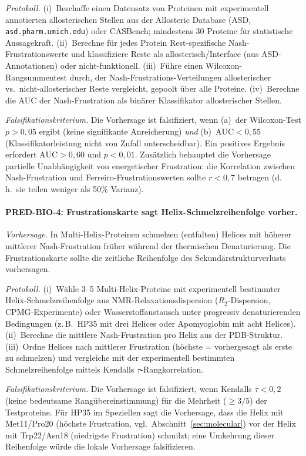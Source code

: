 \documentclass[12pt,a4paper]{article}
\theoremstyle{remark}
\begin{document}
\textit{Protokoll.}
(i)~Beschaffe einen Datensatz von Proteinen mit experimentell annotierten allosterischen Stellen aus der Allosteric Database (ASD, \texttt{asd.pharm.umich.edu}) oder CASBench; mindestens 30 Proteine f\"ur statistische Aussagekraft.
(ii)~Berechne f\"ur jedes Protein Rest-spezifische Nash-Frustrationswerte und klassifiziere Reste als allosterisch/Interface (aus ASD-Annotationen) oder nicht-funktionell.
(iii)~F\"uhre einen Wilcoxon-Rangsummentest durch, der Nash-Frustrations-Verteilungen allosterischer vs.\ nicht-allosterischer Reste vergleicht, gepoolt \"uber alle Proteine.
(iv)~Berechne die AUC der Nash-Frustration als bin\"arer Klassifikator allosterischer Stellen.

\textit{Falsifikationskriterium.}
Die Vorhersage ist falsifiziert, wenn (a)~der Wilcoxon-Test $p > 0{,}05$ ergibt (keine signifikante Anreicherung) \emph{und} (b)~$\text{AUC} < 0{,}55$ (Klassifikatorleistung nicht von Zufall unterscheidbar). Ein positives Ergebnis erfordert $\text{AUC} > 0{,}60$ und $p < 0{,}01$. Zus\"atzlich behauptet die Vorhersage partielle Unabh\"angigkeit von energetischer Frustration: die Korrelation zwischen Nash-Frustration und Ferreiro-Frustrationswerten sollte $r < 0{,}7$ betragen (d.\,h.\ sie teilen weniger als 50\% Varianz).

\paragraph{PRED-BIO-4: Frustrationskarte sagt Helix-Schmelzreihenfolge vorher.}

\textit{Vorhersage.}
In Multi-Helix-Proteinen schmelzen (entfalten) Helices mit h\"oherer mittlerer Nash-Frustration fr\"uher w\"ahrend der thermischen Denaturierung. Die Frustrationskarte sollte die zeitliche Reihenfolge des Sekund\"arstrukturverlusts vorhersagen.

\textit{Protokoll.}
(i)~W\"ahle 3--5 Multi-Helix-Proteine mit experimentell bestimmter Helix-Schmelzreihenfolge aus NMR-Relaxationsdispersion ($R_2$-Dispersion, CPMG-Experimente) oder Wasserstoffaustausch unter progressiv denaturierenden Bedingungen (z.\,B.\ HP35 mit drei Helices oder Apomyoglobin mit acht Helices).
(ii)~Berechne die mittlere Nash-Frustration pro Helix aus der PDB-Struktur.
(iii)~Ordne Helices nach mittlerer Frustration (h\"ochste = vorhergesagt als erste zu schmelzen) und vergleiche mit der experimentell bestimmten Schmelzreihenfolge mittels Kendalls $\tau$-Rangkorrelation.

\textit{Falsifikationskriterium.}
Die Vorhersage ist falsifiziert, wenn Kendalls $\tau < 0{,}2$ (keine bedeutsame Rang\"ubereinstimmung) f\"ur die Mehrheit ($\geq 3/5$) der Testproteine. F\"ur HP35 im Speziellen sagt die Vorhersage, dass die Helix mit Met11/Pro20 (h\"ochste Frustration, vgl.\ Abschnitt~\ref{sec:molecular}) vor der Helix mit Trp22/Asn18 (niedrigste Frustration) schmilzt; eine Umkehrung dieser Reihenfolge w\"urde die lokale Vorhersage falsifizieren.
\end{document}
